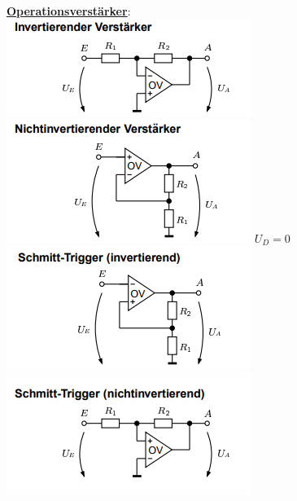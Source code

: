 \documentclass[11pt]{article}
\begin{document}
\begin{landscape}
\begin{minipage}{0.3\textwidth}
\end{minipage}%
~~~~~~
\begin{minipage}{0.3\textwidth}
\underline{\textbf{Operationsverstärker}}:\\
\includegraphics[scale=0.40]{IOV.png}
\includegraphics[scale=0.40]{NIOV.png}
$U_D = 0$
\includegraphics[scale=0.40]{ISTOV.png}
\includegraphics[scale=0.40]{NISTOV.png}
\end{minipage}%

\end{landscape}
\end{document}
